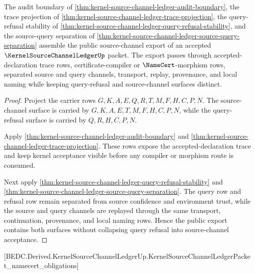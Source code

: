 \begin{theorem}
\label{thm:kernel-source-channel-ledger-public-export-package}
The audit boundary of \autoref{thm:kernel-source-channel-ledger-audit-boundary}, the trace projection of \autoref{thm:kernel-source-channel-ledger-trace-projection}, the query-refusal stability of \autoref{thm:kernel-source-channel-ledger-query-refusal-stability}, and the source-query separation of \autoref{thm:kernel-source-channel-ledger-source-query-separation} assemble the public source-channel export of an accepted $\KernelSourceChannelLedgerUp$ packet. The export passes through accepted-declaration trace rows, certificate-compiler or $\NameCert$-morphism rows, separated source and query channels, transport, replay, provenance, and local naming while keeping query-refusal and source-channel surfaces distinct.
\end{theorem}
\begin{proof}
Project the carrier rows $G,K,A,E,Q,R,T,M,F,H,C,P,N$. The source-channel surface is carried by $G,K,A,E,T,M,F,H,C,P,N$, while the query-refusal surface is carried by $Q,R,H,C,P,N$.

Apply \autoref{thm:kernel-source-channel-ledger-audit-boundary} and \autoref{thm:kernel-source-channel-ledger-trace-projection}. These rows expose the accepted-declaration trace and keep kernel acceptance visible before any compiler or morphism route is consumed.

Next apply \autoref{thm:kernel-source-channel-ledger-query-refusal-stability} and \autoref{thm:kernel-source-channel-ledger-source-query-separation}. The query row and refusal row remain separated from source confidence and environment trust, while the source and query channels are replayed through the same transport, continuation, provenance, and local naming rows. Hence the public export contains both surfaces without collapsing query refusal into source-channel acceptance.
\end{proof}

[BEDC.Derived.KernelSourceChannelLedgerUp.KernelSourceChannelLedgerPacket\_namecert\_obligations]

